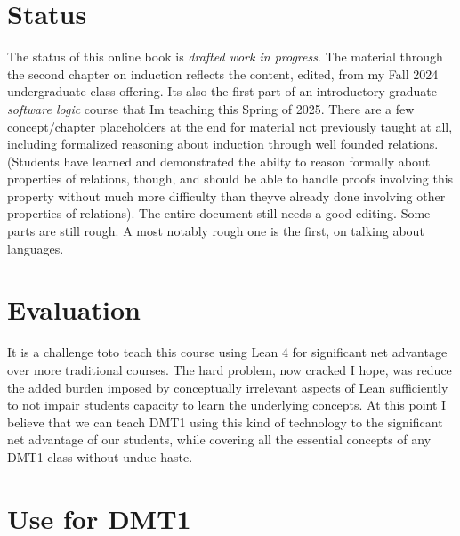 \documentclass{book}
\begin{document}
\hypertarget{book__pandoc__debug__src__preface.md__status}{%
\section*{Status}\label{book__pandoc__debug__src__preface.md__status}}

The status of this online book is \emph{drafted work in progress}. The material through the second
chapter on induction reflects the content, edited, from my Fall 2024 undergraduate class offering.
It\textquotesingle s also the first part of an introductory graduate \emph{software logic} course that I\textquotesingle m teaching
this Spring of 2025. There are a few concept/chapter placeholders at the end for material not previously taught at all, including formalized reasoning about induction through well founded relations. (Students have learned and demonstrated the abilty to reason formally about properties of relations, though, and should be able to handle proofs involving this property without much more difficulty than they\textquotesingle ve already done involving other properties of relations). The entire document still needs a good editing. Some parts are still rough. A most notably rough one is the first, on talking about languages.

\hypertarget{book__pandoc__debug__src__preface.md__evaluation}{%
\section*{Evaluation}\label{book__pandoc__debug__src__preface.md__evaluation}}

It is a challenge toto teach this course using Lean 4 for significant net advantage over more traditional courses. The hard problem, now cracked I hope, was reduce the added burden imposed by conceptually irrelevant aspects of Lean sufficiently to not impair students\textquotesingle{} capacity to learn the underlying concepts. At this point I believe that we can teach DMT1 using this kind of technology to the significant net advantage of our students, while covering all the essential concepts of any DMT1 class without undue haste.

\hypertarget{book__pandoc__debug__src__preface.md__use-for-dmt1}{%
\section*{Use for DMT1}\label{book__pandoc__debug__src__preface.md__use-for-dmt1}}
\end{document}
